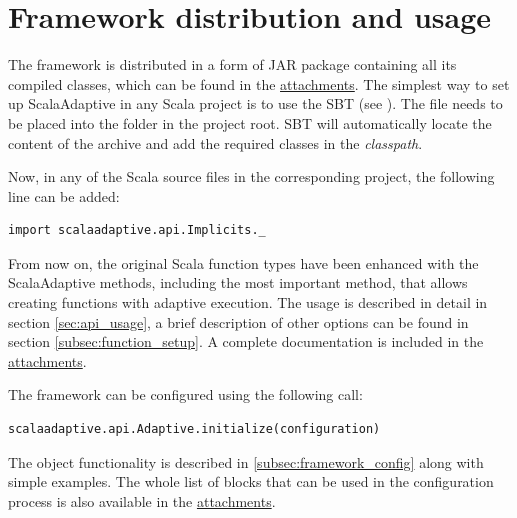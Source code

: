 \section{Framework distribution and usage}

The framework is distributed in a form of JAR package containing all its compiled classes, which can be found in the \hyperref[attach:cd]{attachments}. The simplest way to set up ScalaAdaptive in any Scala project is to use the SBT (see \cite{noauthor_sbt_nodate}). The  file needs to be placed into the  folder in the project root. SBT will automatically locate the content of the archive and add the required classes in the \textit{classpath}.

Now, in any of the Scala source files in the corresponding project, the following line can be added:
\lstset{style=Scala}
\begin{lstlisting}
import scalaadaptive.api.Implicits._
\end{lstlisting}

From now on, the original Scala function types have been enhanced with the ScalaAdaptive methods, including the most important  method, that allows creating functions with adaptive execution. The usage is described in detail in section \ref{sec:api_usage}, a brief description of other options can be found in section \ref{subsec:function_setup}. A complete documentation is included in the \hyperref[attach:scaladoc]{attachments}.

The framework can be configured using the following call:
\lstset{style=Scala}
\begin{lstlisting}
scalaadaptive.api.Adaptive.initialize(configuration)
\end{lstlisting}

The  object functionality is described in \ref{subsec:framework_config} along with simple examples. The whole list of blocks that can be used in the configuration process is also available in the \hyperref[attach:config_blocks]{attachments}.
